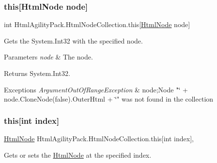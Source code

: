 \subsubsection{\texorpdfstring{this[Html\+Node node]}{this[HtmlNode node]}}
{\footnotesize\ttfamily int Html\+Agility\+Pack.\+Html\+Node\+Collection.\+this\mbox{[}\hyperlink{class_html_agility_pack_1_1_html_node}{Html\+Node} node\mbox{]}\hspace{0.3cm}{\ttfamily [get]}}



Gets the System.\+Int32 with the specified node. 


\begin{DoxyParams}{Parameters}
{\em node} & The node.\\
\hline
\end{DoxyParams}
\begin{DoxyReturn}{Returns}
System.\+Int32.
\end{DoxyReturn}

\begin{DoxyExceptions}{Exceptions}
{\em Argument\+Out\+Of\+Range\+Exception} & node;Node "\char`\"{} + node.\+Clone\+Node(false).\+Outer\+Html + \char`\"{}" was not found in the collection\\
\hline
\end{DoxyExceptions}
\mbox{\label{class_html_agility_pack_1_1_html_node_collection_a999ccc9db0cc0a9ed91c2a29a937b74d}} 
\subsubsection{\texorpdfstring{this[int index]}{this[int index]}}
{\footnotesize\ttfamily \hyperlink{class_html_agility_pack_1_1_html_node}{Html\+Node} Html\+Agility\+Pack.\+Html\+Node\+Collection.\+this\mbox{[}int index\mbox{]}\hspace{0.3cm}{\ttfamily [get]}, {\ttfamily [set]}}



Gets or sets the \hyperlink{class_html_agility_pack_1_1_html_node}{Html\+Node} at the specified index. 


